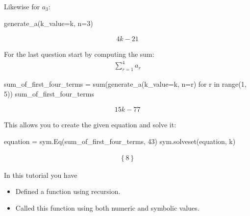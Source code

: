 Likewise for \(a_3\):




\begin{pyin}
generate_a(k_value=k, n=3)
\end{pyin}




\begin{equation*}
\begin{split}\displaystyle 4 k - 21\end{split}
\end{equation*}




For the last question start by computing the sum:
\begin{equation*}
\begin{split}
    \sum_{r=1}^4 a_r
\end{split}
\end{equation*}



\begin{pyin}
sum_of_first_four_terms = sum(generate_a(k_value=k, n=r) for r in range(1, 5))
sum_of_first_four_terms
\end{pyin}




\begin{equation*}
\begin{split}\displaystyle 15 k - 77\end{split}
\end{equation*}




This allows you to create the given equation and solve it:




\begin{pyin}
equation = sym.Eq(sum_of_first_four_terms, 43)
sym.solveset(equation, k)
\end{pyin}




\begin{equation*}
\begin{split}\displaystyle \left\{8\right\}\end{split}
\end{equation*}





\begin{note}
In this tutorial you have
\begin{itemize}
\item 

Defined a function using recursion.

\item 

Called this function using both numeric and symbolic values.

\end{itemize}
\end{note}





